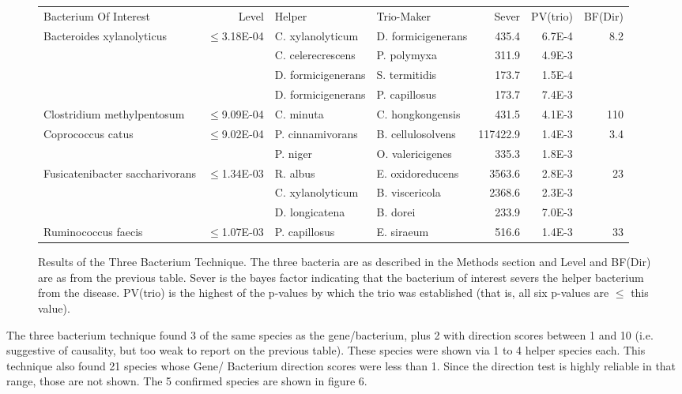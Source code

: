 \documentclass[a4paper]{article}
\begin{document}
\begin{figure}[t]
  \begin{tabularx}{\textwidth}{lrllrrr}
Bacterium Of Interest & Level & Helper & Trio-Maker & Sever & PV(trio) & BF(Dir)\\
\hhline{=======}
Bacteroides xylanolyticus & $\leq$3.18E-04 & C. xylanolyticum & D.
formicigenerans &  435.4 & 6.7E-4 & 8.2 \\
\cline{3-6}
& & C. celerecrescens & P. polymyxa &  311.9 & 4.9E-3 &  \\
\cline{3-6}
& & D. formicigenerans & S. termitidis &  173.7 & 1.5E-4 &  \\
\cline{3-6}
& & D. formicigenerans & P. capillosus &  173.7 & 7.4E-3 &  \\
\cline{1-7}
Clostridium methylpentosum & $\leq$9.09E-04 &C. minuta & C. hongkongensis &  431.5 & 4.1E-3 & 110 \\
\cline{1-7}
Coprococcus catus & $\leq$9.02E-04 & P. cinnamivorans & B. cellulosolvens &  117422.9 & 1.4E-3 & 3.4 \\
\cline{3-6}
&  & P. niger & O. valericigenes &  335.3 & 1.8E-3 &  \\
\cline{1-7}
Fusicatenibacter saccharivorans & $\leq$1.34E-03 & R. albus & E. oxidoreducens &  3563.6 & 2.8E-3 & 23 \\
\cline{3-6}
& & C. xylanolyticum & B. viscericola &  2368.6 & 2.3E-3 &  \\
\cline{3-6}
& & D. longicatena & B. dorei &  233.9 & 7.0E-3 &  \\
\cline{1-7}
Ruminococcus faecis & $\leq$1.07E-03 & P. capillosus & E. siraeum &  516.6 & 1.4E-3 & 33 \\
\cline{1-7}
  \end{tabularx}
  \caption{Results of the Three Bacterium Technique.  The three
    bacteria are as described in the Methods section and Level and BF(Dir)
    are as from the previous table.  Sever is the bayes factor
    indicating that the bacterium of interest severs the helper
    bacterium from the disease.  PV(trio) is the highest of the
    p-values by which the trio was established (that is, all six
    p-values are $\leq$ this value).}
\end{figure}

The three bacterium technique found 3 of the same species as the
gene/bacterium, plus 2 with direction scores between 1 and 10
(i.e. suggestive of causality, but too weak to report on the previous
table).  These species were shown via 1 to 4 helper species each.
This technique also found 21 species whose Gene/ Bacterium direction
scores were less than 1.  Since the direction test is highly reliable
in that range, those are not shown.  The 5 confirmed species are shown
in figure 6.
\end{document}
